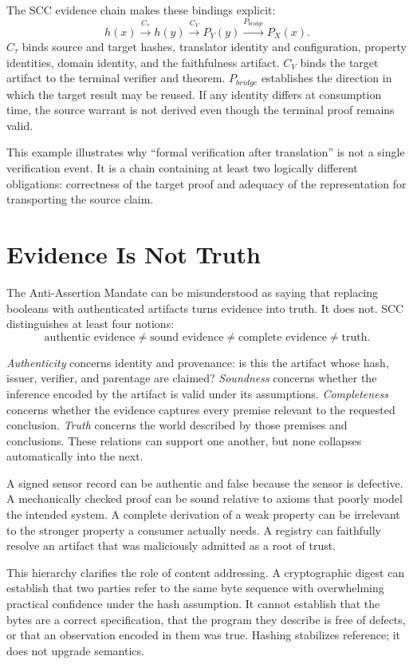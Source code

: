 \documentclass[11pt]{article}
\begin{document}
The SCC evidence chain makes these bindings explicit:
\[
h(x)\xrightarrow{C_{\tau}}h(y)
\xrightarrow{C_V}P_Y(y)
\xrightarrow{P_{bridge}}P_X(x).
\]
$C_{\tau}$ binds source and target hashes, translator identity and configuration, property identities, domain identity, and the faithfulness artifact. $C_V$ binds the target artifact to the terminal verifier and theorem. $P_{bridge}$ establishes the direction in which the target result may be reused. If any identity differs at consumption time, the source warrant is not derived even though the terminal proof remains valid.

This example illustrates why ``formal verification after translation'' is not a single verification event. It is a chain containing at least two logically different obligations: correctness of the target proof and adequacy of the representation for transporting the source claim.

\section{Evidence Is Not Truth}
The Anti-Assertion Mandate can be misunderstood as saying that replacing booleans with authenticated artifacts turns evidence into truth. It does not. SCC distinguishes at least four notions:
\[
\text{authentic evidence}
\neq
\text{sound evidence}
\neq
\text{complete evidence}
\neq
\text{truth}.
\]

\emph{Authenticity} concerns identity and provenance: is this the artifact whose hash, issuer, verifier, and parentage are claimed? \emph{Soundness} concerns whether the inference encoded by the artifact is valid under its assumptions. \emph{Completeness} concerns whether the evidence captures every premise relevant to the requested conclusion. \emph{Truth} concerns the world described by those premises and conclusions. These relations can support one another, but none collapses automatically into the next.

A signed sensor record can be authentic and false because the sensor is defective. A mechanically checked proof can be sound relative to axioms that poorly model the intended system. A complete derivation of a weak property can be irrelevant to the stronger property a consumer actually needs. A registry can faithfully resolve an artifact that was maliciously admitted as a root of trust.

This hierarchy clarifies the role of content addressing. A cryptographic digest can establish that two parties refer to the same byte sequence with overwhelming practical confidence under the hash assumption. It cannot establish that the bytes are a correct specification, that the program they describe is free of defects, or that an observation encoded in them was true. Hashing stabilizes reference; it does not upgrade semantics.
\end{document}
